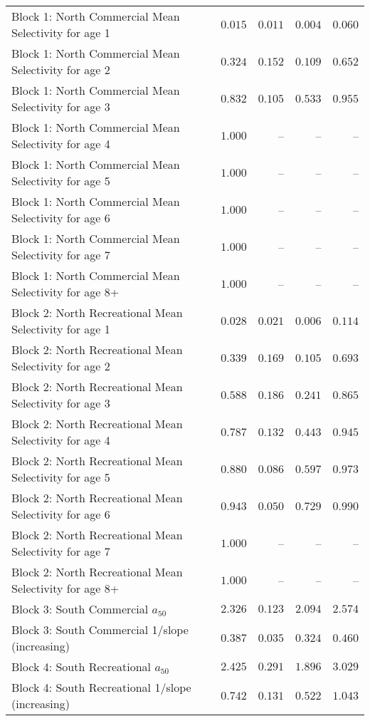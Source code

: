 \documentclass[
]{article}
\begin{document}
\begin{landscape}
\begin{longtable}[t]{lrrrr}
Block 1: North Commercial Mean Selectivity for age 1 & $0.015$ & $0.011$ & $0.004$ & $0.060$\\
Block 1: North Commercial Mean Selectivity for age 2 & $0.324$ & $0.152$ & $0.109$ & $0.652$\\
Block 1: North Commercial Mean Selectivity for age 3 & $0.832$ & $0.105$ & $0.533$ & $0.955$\\
Block 1: North Commercial Mean Selectivity for age 4 & $1.000$ & -- & -- & --\\
\addlinespace
Block 1: North Commercial Mean Selectivity for age 5 & $1.000$ & -- & -- & --\\
Block 1: North Commercial Mean Selectivity for age 6 & $1.000$ & -- & -- & --\\
Block 1: North Commercial Mean Selectivity for age 7 & $1.000$ & -- & -- & --\\
Block 1: North Commercial Mean Selectivity for age 8+ & $1.000$ & -- & -- & --\\
Block 2: North Recreational Mean Selectivity for age 1 & $0.028$ & $0.021$ & $0.006$ & $0.114$\\
\addlinespace
Block 2: North Recreational Mean Selectivity for age 2 & $0.339$ & $0.169$ & $0.105$ & $0.693$\\
Block 2: North Recreational Mean Selectivity for age 3 & $0.588$ & $0.186$ & $0.241$ & $0.865$\\
Block 2: North Recreational Mean Selectivity for age 4 & $0.787$ & $0.132$ & $0.443$ & $0.945$\\
Block 2: North Recreational Mean Selectivity for age 5 & $0.880$ & $0.086$ & $0.597$ & $0.973$\\
Block 2: North Recreational Mean Selectivity for age 6 & $0.943$ & $0.050$ & $0.729$ & $0.990$\\
\addlinespace
Block 2: North Recreational Mean Selectivity for age 7 & $1.000$ & -- & -- & --\\
Block 2: North Recreational Mean Selectivity for age 8+ & $1.000$ & -- & -- & --\\
Block 3: South Commercial $a_{50}$ & $2.326$ & $0.123$ & $2.094$ & $2.574$\\
Block 3: South Commercial 1/slope (increasing) & $0.387$ & $0.035$ & $0.324$ & $0.460$\\
Block 4: South Recreational $a_{50}$ & $2.425$ & $0.291$ & $1.896$ & $3.029$\\
\addlinespace
Block 4: South Recreational 1/slope (increasing) & $0.742$ & $0.131$ & $0.522$ & $1.043$\\

\end{longtable}
\end{landscape}
\end{document}
